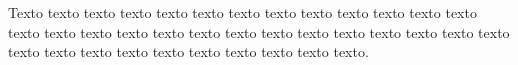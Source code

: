 \label{an:exemplo-de-anexo}

Texto texto texto texto texto texto texto  texto texto texto  texto texto texto  texto texto texto  texto texto texto  texto texto texto  texto texto texto  texto texto texto  texto texto texto  texto texto texto  texto texto texto.

